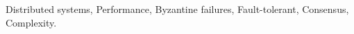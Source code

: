 \begin{abstract}
\end{abstract}

 Distributed systems, Performance, Byzantine
failures, Fault-tolerant, Consensus, Complexity.

